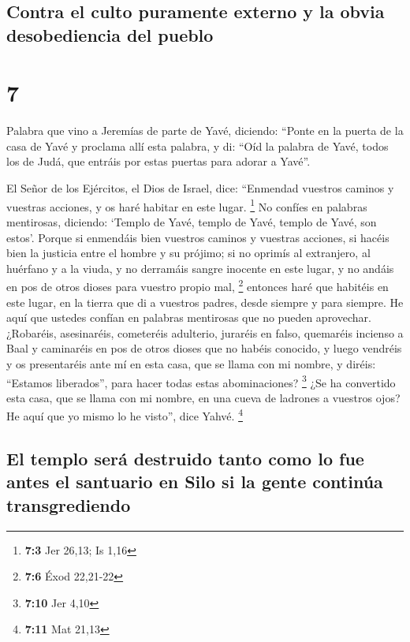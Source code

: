 \hypertarget{contra-el-culto-puramente-externo-y-la-obvia-desobediencia-del-pueblo}{%
\subsection{Contra el culto puramente externo y la obvia desobediencia
del
pueblo}\label{contra-el-culto-puramente-externo-y-la-obvia-desobediencia-del-pueblo}}

\hypertarget{section-6}{%
\section{7}\label{section-6}}

 Palabra que vino a Jeremías de parte de Yavé, diciendo:
 ``Ponte en la puerta de la casa de Yavé y proclama allí
esta palabra, y di: ``Oíd la palabra de Yavé, todos los de Judá, que
entráis por estas puertas para adorar a Yavé''.

 El Señor de los Ejércitos, el Dios de Israel, dice:
``Enmendad vuestros caminos y vuestras acciones, y os haré habitar en
este lugar. \footnote{\textbf{7:3} Jer 26,13; Is 1,16}  No
confíes en palabras mentirosas, diciendo: `Templo de Yavé, templo de
Yavé, templo de Yavé, son estos'.  Porque si enmendáis
bien vuestros caminos y vuestras acciones, si hacéis bien la justicia
entre el hombre y su prójimo;  si no oprimís al
extranjero, al huérfano y a la viuda, y no derramáis sangre inocente en
este lugar, y no andáis en pos de otros dioses para vuestro propio mal,
\footnote{\textbf{7:6} Éxod 22,21-22}  entonces haré que
habitéis en este lugar, en la tierra que di a vuestros padres, desde
siempre y para siempre.  He aquí que ustedes confían en
palabras mentirosas que no pueden aprovechar.  ¿Robaréis,
asesinaréis, cometeréis adulterio, juraréis en falso, quemaréis incienso
a Baal y caminaréis en pos de otros dioses que no habéis conocido,
 y luego vendréis y os presentaréis ante mí en esta casa,
que se llama con mi nombre, y diréis: ``Estamos liberados'', para hacer
todas estas abominaciones? \footnote{\textbf{7:10} Jer 4,10}
 ¿Se ha convertido esta casa, que se llama con mi nombre,
en una cueva de ladrones a vuestros ojos? He aquí que yo mismo lo he
visto'', dice Yahvé. \footnote{\textbf{7:11} Mat 21,13}

\hypertarget{el-templo-seruxe1-destruido-tanto-como-lo-fue-antes-el-santuario-en-silo-si-la-gente-continuxfaa-transgrediendo}{%
\subsection{El templo será destruido tanto como lo fue antes el
santuario en Silo si la gente continúa
transgrediendo}\label{el-templo-seruxe1-destruido-tanto-como-lo-fue-antes-el-santuario-en-silo-si-la-gente-continuxfaa-transgrediendo}}

